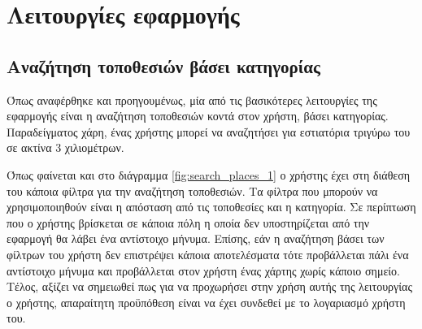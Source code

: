 \documentclass[oneside, 12pt]{book}
\begin{document}
\section{Λειτουργίες εφαρμογής}
\subsection{Αναζήτηση τοποθεσιών βάσει κατηγορίας}
Όπως αναφέρθηκε και προηγουμένως, μία από τις βασικότερες λειτουργίες 
της εφαρμογής είναι η αναζήτηση τοποθεσιών κοντά στον χρήστη, βάσει 
κατηγορίας. Παραδείγματος χάρη, ένας χρήστης μπορεί να αναζητήσει για 
εστιατόρια τριγύρω του σε ακτίνα 3 χιλιομέτρων.

Όπως φαίνεται και στο διάγραμμα \ref{fig:search_places_1} ο χρήστης 
έχει στη διάθεση του κάποια φίλτρα για την αναζήτηση τοποθεσιών. Τα 
φίλτρα που μπορούν να χρησιμοποιηθούν είναι η απόσταση από τις 
τοποθεσίες και η κατηγορία. Σε περίπτωση που ο χρήστης βρίσκεται σε 
κάποια πόλη η οποία δεν υποστηρίζεται από την εφαρμογή θα λάβει ένα 
αντίστοιχο μήνυμα. Επίσης, εάν η αναζήτηση βάσει των φίλτρων του 
χρήστη δεν επιστρέψει κάποια αποτελέσματα τότε προβάλλεται πάλι ένα 
αντίστοιχο μήνυμα και προβάλλεται στον χρήστη ένας χάρτης χωρίς κάποιο
σημείο. Τέλος, αξίζει να σημειωθεί πως για να προχωρήσει στην χρήση 
αυτής της λειτουργίας ο χρήστης, απαραίτητη προϋπόθεση είναι να έχει 
συνδεθεί με το λογαριασμό χρήστη του. 
\end{document}
